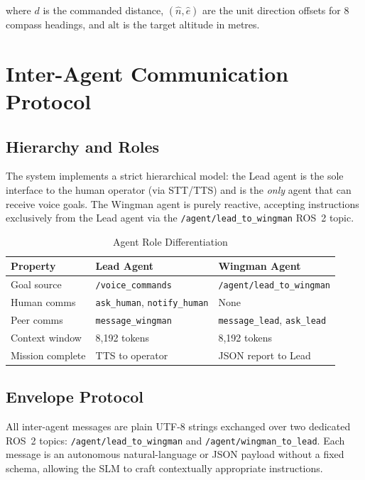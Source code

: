 \documentclass[conference]{IEEEtran}
\begin{document}
where $d$ is the commanded distance, $(\hat{n}, \hat{e})$ are the unit direction offsets for 8 compass headings, and $\text{alt}$ is the target altitude in metres.

\section{Inter-Agent Communication Protocol}
\label{sec:comms}

\subsection{Hierarchy and Roles}

The system implements a strict hierarchical model: the Lead agent is the sole interface to the human operator (via STT/TTS) and is the \emph{only} agent that can receive voice goals. The Wingman agent is purely reactive, accepting instructions exclusively from the Lead agent via the \texttt{/agent/lead\_to\_wingman} ROS~2 topic.

\begin{table}[htbp]
\caption{Agent Role Differentiation}
\label{tab:roles}
\centering
\begin{tabular}{@{}lp{2.2cm}p{2.2cm}@{}}
\toprule
\textbf{Property} & \textbf{Lead Agent} & \textbf{Wingman Agent} \\
\midrule
Goal source & \texttt{/voice\_commands} & \texttt{/agent/lead\_to\_wingman} \\
Human comms & \texttt{ask\_human}, \texttt{notify\_human} & None \\
Peer comms & \texttt{message\_wingman} & \texttt{message\_lead}, \texttt{ask\_lead} \\
Context window & 8,192 tokens & 8,192 tokens \\
Mission complete & TTS to operator & JSON report to Lead \\
\bottomrule
\end{tabular}
\end{table}

\subsection{Envelope Protocol}

All inter-agent messages are plain UTF-8 strings exchanged over two dedicated ROS~2 topics: \texttt{/agent/lead\_to\_wingman} and \texttt{/agent/wingman\_to\_lead}. Each message is an autonomous natural-language or JSON payload without a fixed schema, allowing the SLM to craft contextually appropriate instructions.
\end{document}
